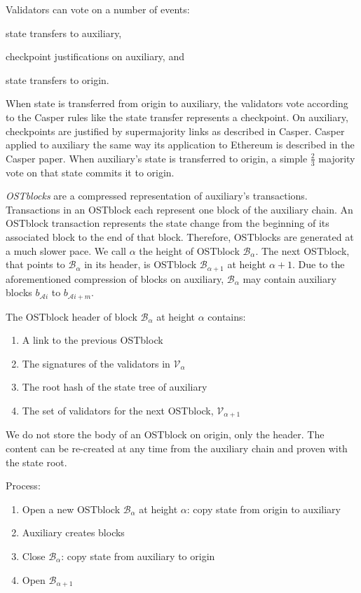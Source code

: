 \documentclass[12pt,a4paper]{article}
\newcommand{\A}{\mathcal{A}}
\newcommand{\V}{\mathcal{V}}
\newcommand{\B}{\mathcal{B}}
\begin{document}
Validators can vote on a number of events:
\begin{inparaenum}[(a)]
	\item state transfers to auxiliary,
	\item checkpoint justifications on auxiliary, and
 	\item state transfers to origin.
\end{inparaenum}
When state is transferred from origin to auxiliary,
the validators vote according to the Casper rules like the state transfer represents a checkpoint.
On auxiliary, checkpoints are justified by supermajority links as described in Casper.
Casper applied to auxiliary the same way its application to Ethereum is described in the Casper paper.
When auxiliary's state is transferred to origin, a simple $\frac{2}{3}$ majority vote on that state commits it to origin.

\emph{OSTblocks} are a compressed representation of auxiliary's transactions.
Transactions in an OSTblock each represent one block of the auxiliary chain.
An OSTblock transaction represents the state change from the beginning of its associated block to the end of that block.
Therefore, OSTblocks are generated at a much slower pace.
We call $\alpha$ the height of OSTblock $\B_\alpha$.
The next OSTblock, that points to $\B_\alpha$ in its header,
is OSTblock $\B_{\alpha+1}$ at height $\alpha+1$.
Due to the aforementioned compression of blocks on auxiliary,
$\B_\alpha$ may contain auxiliary blocks $b_{\A{}i}$ to $b_{\A{}i+m}$.

The OSTblock header of block $\B_\alpha$ at height $\alpha$ contains:
\begin{enumerate}
	\item A link to the previous OSTblock
	\item The signatures of the validators in $\V_\alpha$
	\item The root hash of the state tree of auxiliary
	\item The set of validators for the next OSTblock, $\V_{\alpha+1}$
\end{enumerate}
We do not store the body of an OSTblock on origin, only the header.
The content can be re-created at any time from the auxiliary chain and proven with the state root.

Process:
\begin{enumerate}
	\item Open a new OSTblock $\B_\alpha$ at height $\alpha$: copy state from origin to auxiliary
	\item Auxiliary creates blocks
	\item Close $\B_\alpha$: copy state from auxiliary to origin
	\item Open $\B_{\alpha+1}$
\end{enumerate}
\end{document}
